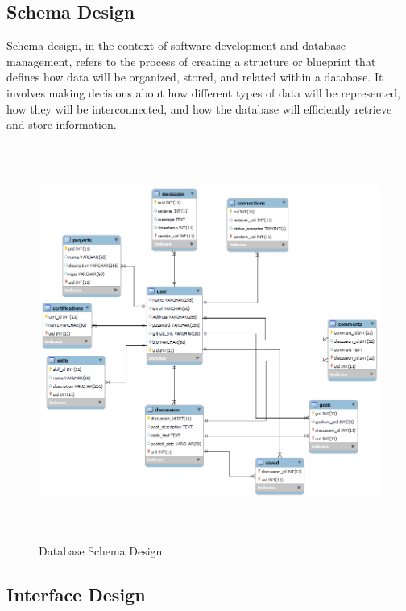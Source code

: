 \subsection{Schema Design}
Schema design, in the context of software development and database management, refers to the process of creating a structure or blueprint that defines how data will be organized, stored, and related within a database. It involves making decisions about how different types of data will be represented, how they will be interconnected, and how the database will efficiently retrieve and store information.
\begin{figure}[H]
    \centering
    \includegraphics[height = 13cm]{Diagrams/schema.png}
    \caption{Database Schema Design}
\end{figure}
\newpage
\subsection{Interface Design}
